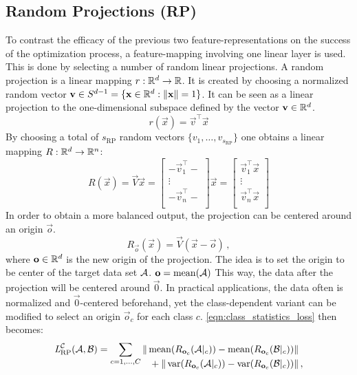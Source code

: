 \subsection{Random Projections (RP)}
To contrast the efficacy of the previous two feature-representations on the success of the optimization process,
a feature-mapping involving one linear layer is used. This is done by selecting a number of  random linear projections.
A random projection is a linear mapping $r: \mathbb{R}^d \to \mathbb{R}$.
It is created by choosing a normalized random vector $\mathbf v \in S^{d-1} = \{\mathbf x \in \mathbb{R}^d : \|\mathbf x\| = 1\}$.
It can be seen as a linear projection to the one-dimensional subspace defined by the vector $\mathbf v \in \mathbb{R}^d$.
\[
    r(\vec x) = \vec v ^\top \vec x
\]
By choosing a total of $s_\text{RP}$ random vectors $\{v_1, \dots, v_{s_\text{RP}}\}$ one obtains a linear mapping $R: \mathbb{R}^d \to \mathbb{R}^n$:
\[
    R(\vec x) = \vec V \vec x =
    \begin{bmatrix}
        - \vec v_1 ^\top - \\
        \vdots \\
        - \vec v_n ^\top - \\
    \end{bmatrix}
    \vec x =
    \begin{bmatrix}
        \vec v_1 ^\top \vec x \\
        \vdots \\
        \vec v_n ^\top \vec x \\
    \end{bmatrix}
\]
%
In order to obtain a more balanced output,
the projection can be centered around an origin $\vec o$.
% 
\[
    R_{\vec o} (\vec x) = \vec V (\vec x - \vec o) \,,
\]
where $\mathbf o \in \mathbb{R}^d$ is the new origin of the projection. 
The idea is to set the origin to be center of the target data set $\mathcal A$. $\mathbf o = \operatorname{mean} (\mathcal A)$
This way, the data after the projection will be centered around $\vec 0$.
In practical applications, the data often is normalized and $\vec 0$-centered beforehand,
yet the class-dependent variant can be modified to select an origin $\vec o_c$ for each class $c$.
\cref{eqn:class_statistics_loss} then becomes:
% 
\begin{equation*}
    \textit{L} _{\text{RP}} ^{\mathcal C} (\mathcal A, \mathcal B) =
    \sum _{c = 1, \dots, C}
    \begin{alignedat}[t]{1}
        \|\operatorname{mean} ({R_{\mathbf o_c} (\mathcal A|_c)}) - \operatorname{mean} ({R_{\mathbf o_c} (\mathcal B|_c)}) &\| \\
        {} + \|\operatorname{var} ({R_{\mathbf o_c} (\mathcal A|_c)}) - \operatorname{var} ({R_{\mathbf o_c} (\mathcal B|_c)}) &\|  \,,
    \end{alignedat}
\end{equation*}
